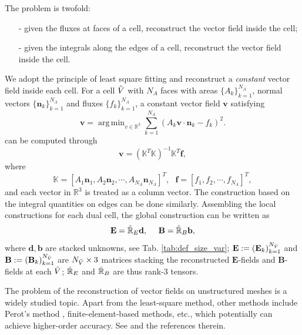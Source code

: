\documentclass{article}
\DeclareMathOperator*{\argmin}{arg\,min}
\begin{document}
The problem is twofold:
\begin{itemize}
    \item[-] given the fluxes at faces of a cell, reconstruct the vector field inside the cell;
    \item[-] given the integrals along the edges of a cell, reconstruct the vector field inside the cell. 
\end{itemize}
We adopt the principle of least square fitting and reconstruct a \emph{constant} vector field inside each cell. For a cell $\Tilde{V}$ with $N_A$ faces with areas $\{A_k\}_{k=1}^{N_A}$, normal vectors $\{\mathbf{n}_k\}_{k=1}^{N_A}$ and fluxes $\{f_k\}_{k=1}^{N_A}$, a constant vector field $\mathbf{v}$ satisfying 
\begin{equation*}
    \mathbf{v} = \argmin_{v\in \mathbb{R}^3} \sum_{k=1}^{N_A}(A_k\mathbf{v} \cdot \mathbf{n}_k - f_k)^2.   
\end{equation*} can be computed through
\begin{equation*}
    \mathbf{v} = (\mathbb{K}^T\mathbb{K})^{-1}\mathbb{K}^T\mathbf{f},
\end{equation*}
where
\begin{equation*}
    \mathbb{K} = [A_1\mathbf{n}_1, A_2\mathbf{n}_2, \cdots, A_{N_A}\mathbf{n}_{N_A}]^T,\ \ \ \mathbf{f} = [f_1, f_2, \cdots, f_{N_A}]^T,
\end{equation*}
and each vector in $\mathbb{R}^3$ is treated as a column vector. The construction based on the integral quantities on edges can be done similarly. Assembling the local constructions for each dual cell, the global construction can be written as 
\begin{equation}
    \mathbf{E} = \Tilde{\mathbb{R}}_E\mathbf{d},
    \ \ \ \ 
    \mathbf{B} = \Tilde{\mathbb{R}}_B\mathbf{b}, \label{equ:reconstruction}
\end{equation}
where $\mathbf{d}, \mathbf{b}$ are stacked unknowns, see Tab. \ref{tab:def_size_var}; $\mathbf{E} := (\mathbf{E}_k)_{k=1}^{N_{\Tilde{V}}}$ and $\mathbf{B} := (\mathbf{B}_k)_{k=1}^{N_{\Tilde{V}}}$ are $N_{\Tilde{V}} \times 3$ matrices stacking the reconstructed $\mathbf{E}$-fields and $\mathbf{B}$-fields at each $\Tilde{V}$; $\Tilde{\mathbb{R}}_E$ and $\Tilde{\mathbb{R}}_B$ are thus rank-3 tensors.

The problem of the reconstruction of vector fields on unstructured meshes is a widely studied topic. Apart from the least-square method, other methods include Perot's method \citep{perot_2000}, finite-element-based methods, etc., which potentially can achieve higher-order accuracy. See \cite[][sec. 3.4.4]{fuchs_2021} and the references therein.  
\end{document}
